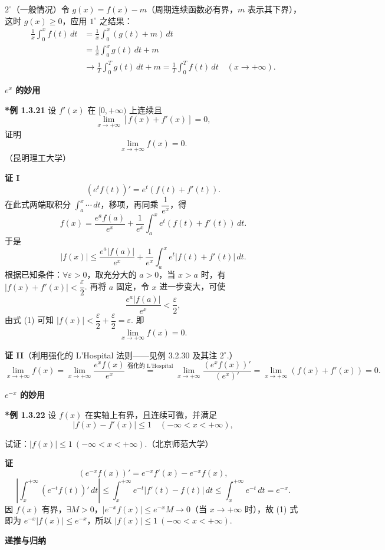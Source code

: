 \documentclass[UTF8, 12pt, fontset=fandol, oneside]{ctexart}
\begin{document}
$2^\circ$（一般情况）令 $g(x)=f(x)-m$（周期连续函数必有界，$m$ 表示其下界），这时
$g(x)\ge0$，应用 $1^\circ$ 之结果：
\[
\begin{aligned}
\frac1x\int_0^xf(t)\,dt
&=\frac1x\int_0^x(g(t)+m)\,dt\\
&=\frac1x\int_0^xg(t)\,dt+m\\
&\to\frac1T\int_0^Tg(t)\,dt+m
=\frac1T\int_0^Tf(t)\,dt
\quad(x\to+\infty).
\end{aligned}
\]

\noindent\textbf{$e^x$ 的妙用}

\noindent\textbf{*例 1.3.21}\quad
设 $f'(x)$ 在 $[0,+\infty)$ 上连续且
\[
  \lim_{x\to+\infty}[f(x)+f'(x)]=0,
\]
证明
\[
  \lim_{x\to+\infty}f(x)=0.
\]
（昆明理工大学）

\noindent\textbf{证 I}\quad
\[
  (e^tf(t))'=e^t(f(t)+f'(t)).
\]
在此式两端取积分 $\int_a^x\cdots\,dt$，移项，再同乘 $\dfrac1{e^x}$，得
\[
  f(x)=\frac{e^af(a)}{e^x}
  +\frac1{e^x}\int_a^xe^t(f(t)+f'(t))\,dt.
\]
于是
\[
  |f(x)|\le
  \frac{e^a|f(a)|}{e^x}
  +\frac1{e^x}\int_a^xe^t|f(t)+f'(t)|\,dt.
  \tag{1}
\]
根据已知条件：$\forall\varepsilon>0$，取充分大的 $a>0$，当 $x>a$ 时，有
$|f(x)+f'(x)|<\dfrac\varepsilon2$. 再将 $a$ 固定，令 $x$ 进一步变大，可使
\[
  \frac{e^a|f(a)|}{e^x}<\frac\varepsilon2,
\]
由式 (1) 可知 $|f(x)|<\dfrac\varepsilon2+\dfrac\varepsilon2=\varepsilon$. 即
\[
  \lim_{x\to+\infty}f(x)=0.
\]

\noindent\textbf{证 II}\quad （利用强化的 L'Hospital 法则——见例 3.2.30 及其注 $2^\circ$.）
\[
  \lim_{x\to+\infty}f(x)
  =\lim_{x\to+\infty}\frac{e^xf(x)}{e^x}
  \stackrel{\text{强化的 L'Hospital}}{=}
  \lim_{x\to+\infty}\frac{(e^xf(x))'}{(e^x)'}
  =\lim_{x\to+\infty}(f(x)+f'(x))=0.
\]

\noindent\textbf{$e^{-x}$ 的妙用}

\noindent\textbf{*例 1.3.22}\quad
设 $f(x)$ 在实轴上有界，且连续可微，并满足
\[
  |f(x)-f'(x)|\le1\quad(-\infty<x<+\infty),
\]

试证：$|f(x)|\le1\ (-\infty<x<+\infty)$.（北京师范大学）

\noindent\textbf{证}\quad
\[
  (e^{-x}f(x))'=e^{-x}f'(x)-e^{-x}f(x),
\]
\[
  \left|\int_x^{+\infty}(e^{-t}f(t))'\,dt\right|
  \le\int_x^{+\infty}e^{-t}|f'(t)-f(t)|\,dt
  \le\int_x^{+\infty}e^{-t}\,dt=e^{-x}. \tag{1}
\]
因 $f(x)$ 有界，$\exists M>0$，$|e^{-x}f(x)|\le e^{-x}M\to0$（当 $x\to+\infty$ 时），故 (1) 式即为
$e^{-x}|f(x)|\le e^{-x}$，所以 $|f(x)|\le1\ (-\infty<x<+\infty)$.

\noindent\textbf{递推与归纳}
\end{document}
